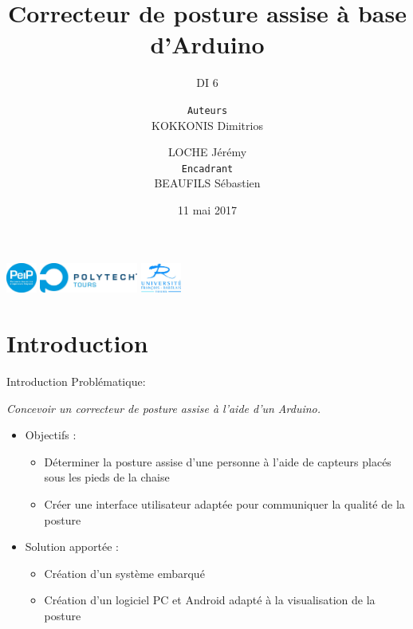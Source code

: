 \documentclass{beamer}
\title{Correcteur de posture assise à base d'Arduino}
\subtitle{\small DI 6}
\author[KOKKONIS Dimitrios \\\and LOCHE Jérémy]{\small {\small \texttt{Auteurs}}\\ KOKKONIS Dimitrios \\\and LOCHE Jérémy\\
\vspace{5px}
{\small \texttt{Encadrant}}\\ BEAUFILS Sébastien}
\institute{\textsc{École Polytechnique de l'Université de Tours}}
\date{11 mai 2017}
\begin{document}
\begin{frame}
\vspace{0.1cm}
\includegraphics[height=1cm]{images/Logo_PeiP_v2009_RGB_3cm_300dpi.jpg}
\includegraphics[height=1cm]{images/logo_Polytech_Tours_RVB_3cm_300dpi.jpg}
\hfill
\includegraphics[height=1cm]{images/logo_UFR_4cm_300dpi.jpg}
\titlepage
\end{frame}



\section*{Introduction}
\begin{frame}
\begin{block}{Introduction}
Problématique:

\begin{center}
\textit{Concevoir un correcteur de posture assise à l'aide d'un Arduino. }
\end{center}

\begin{itemize}
\item Objectifs :
\begin{itemize}
\item Déterminer la posture assise d'une personne à l'aide de capteurs placés sous les pieds de la chaise
\item Créer une interface utilisateur adaptée pour communiquer la qualité de la posture
\end{itemize}
\item Solution apportée :
\begin{itemize}
\item Création d'un système embarqué 
\item Création d'un logiciel  PC et Android adapté à la visualisation de la posture
\end{itemize}
\end{itemize}
\end{block}
\end{frame}
\end{document}
